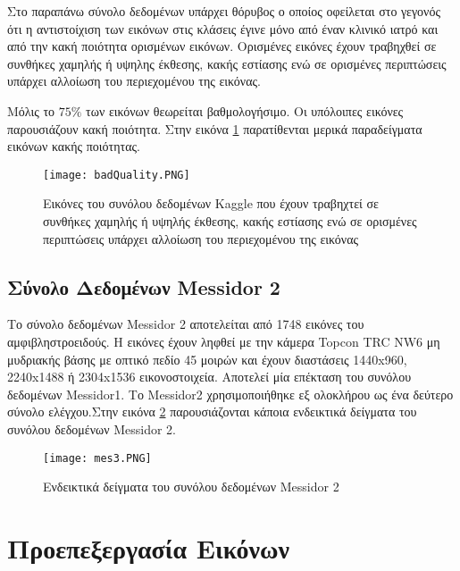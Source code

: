 Στο παραπάνω σύνολο δεδομένων υπάρχει θόρυβος ο οποίος οφείλεται στο γεγονός ότι η αντιστοίχιση των εικόνων στις κλάσεις έγινε μόνο από έναν κλινικό ιατρό και από την κακή ποιότητα ορισμένων εικόνων. Ορισμένες εικόνες έχουν τραβηχθεί σε συνθήκες χαμηλής ή υψηλης έκθεσης, κακής εστίασης ενώ σε ορισμένες περιπτώσεις υπάρχει αλλοίωση του περιεχομένου της εικόνας.

Μόλις το $75\%$ των εικόνων θεωρείται βαθμολογήσιμο.\cite{Rakhlin} Οι υπόλοιπες εικόνες παρουσιάζουν κακή ποιότητα. Στην εικόνα \ref{figure:badquality} παρατίθενται μερικά παραδείγματα εικόνων κακής ποιότητας.  
\begin{figure}[!h]
    \centering
      \texttt{[image: badQuality.PNG]} \caption{Εικόνες του συνόλου δεδομένων Kaggle που έχουν τραβηχτεί σε συνθήκες χαμηλής ή υψηλής έκθεσης, κακής εστίασης ενώ σε ορισμένες περιπτώσεις υπάρχει αλλοίωση του περιεχομένου της εικόνας}
 \label{figure:badquality}    
  \end{figure}


\subsection{Σύνολο Δεδομένων Messidor 2}
\label{subsec:4.1.2}
Το σύνολο δεδομένων Messidor 2 αποτελείται από 1748 εικόνες του αμφιβληστροειδούς. Η εικόνες έχουν ληφθεί με την κάμερα  Topcon TRC NW6 μη μυδριακής βάσης με οπτικό πεδίο 45 μοιρών και έχουν διαστάσεις 1440x960, 2240x1488 ή 2304x1536 εικονοστοιχεία. Αποτελεί μία επέκταση του συνόλου δεδομένων Messidor1\cite{Decencière}. Το Messidor2 χρησιμοποιήθηκε εξ ολοκλήρου ως ένα δεύτερο σύνολο ελέγχου.Στην εικόνα \ref{figure:mes}  παρουσιάζονται κάποια ενδεικτικά δείγματα του συνόλου δεδομένων Messidor 2.

\begin{figure}[!h]
    \centering
      \texttt{[image: mes3.PNG]} \caption{Eνδεικτικά δείγματα του συνόλου δεδομένων Messidor 2}
\label{figure:mes}  
\end{figure}



\section{Προεπεξεργασία Εικόνων}
\label{sec:4.2}
